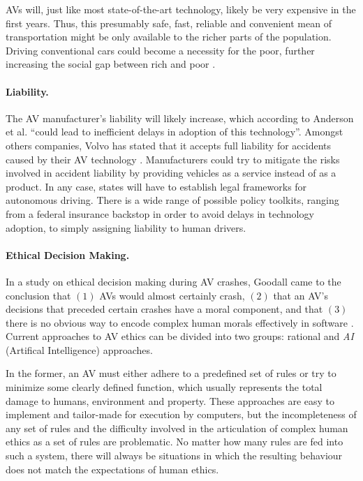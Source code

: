 \documentclass[11pt]{article}
\begin{document}
AVs will, just like most state-of-the-art technology, likely be very expensive in the first years. Thus, this presumably safe, fast, reliable and convenient mean of transportation might be only available to the richer parts of the population. Driving conventional cars could become a necessity for the poor, further increasing the social gap between rich and poor \cite[p. 39]{Anderson2014rand}.

\paragraph{Liability.}
The AV manufacturer's liability will likely increase, which according to Anderson et al. ``could lead to inefficient delays in adoption of this technology''. Amongst others companies, Volvo has stated that it accepts full liability for accidents caused by their AV technology \cite{HarrisVolvo2015}. Manufacturers could try to mitigate the risks involved in accident liability by providing vehicles as a service instead of as a product. In any case, states will have to establish legal frameworks for autonomous driving. There is a wide range of possible policy toolkits, ranging from a federal insurance backstop in order to avoid delays in technology adoption, to simply assigning liability to human drivers.

\paragraph{Ethical Decision Making.}
In a study on ethical decision making during AV crashes, Goodall came to the conclusion that $(1)$ AVs would almost certainly crash, $(2)$ that an AV's decisions that preceded certain crashes have a moral component, and that $(3)$ there is no obvious way to encode complex human morals effectively in software \cite{Goodall2014ethical}. Current approaches to AV ethics can be divided into two groups: rational and \textit{AI} (Artifical Intelligence) approaches. 

In the former, an AV must either adhere to a predefined set of rules or try to minimize some clearly defined function, which usually represents the total damage to humans, environment and property. These approaches are easy to implement and tailor-made for execution by computers, but the incompleteness of any set of rules and the difficulty involved in the articulation of complex human ethics as a set of rules are problematic. No matter how many rules are fed into such a system, there will always be situations in which the resulting behaviour does not match the expectations of human ethics.
\end{document}
